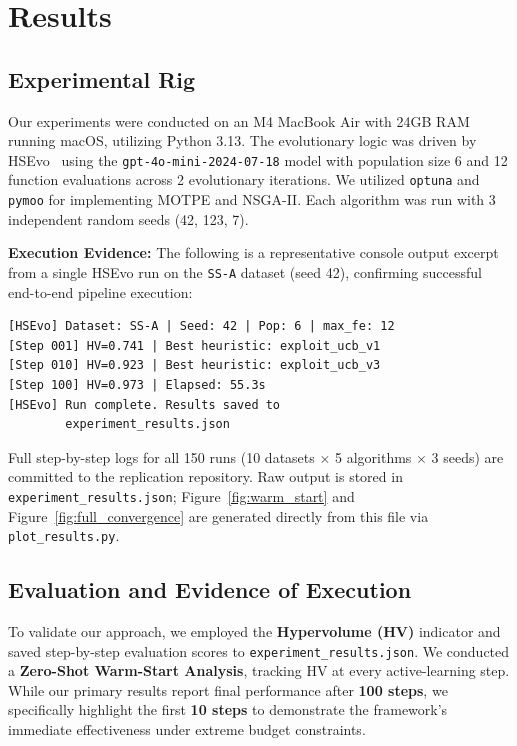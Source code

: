 \documentclass[sigconf,nonacm]{acmart}
\begin{document}
\section{Results}

\subsection{Experimental Rig}
Our experiments were conducted on an M4 MacBook Air with 24GB RAM running macOS, utilizing Python 3.13. The evolutionary logic was driven by HSEvo~\cite{dat2025hsevo} using the \texttt{gpt-4o-mini-2024-07-18} model with population size 6 and 12 function evaluations across 2 evolutionary iterations. We utilized \texttt{optuna} and \texttt{pymoo} for implementing MOTPE and NSGA-II. Each algorithm was run with 3 independent random seeds (42, 123, 7).

\textbf{Execution Evidence:} The following is a representative
console output excerpt from a single HSEvo run on the
\texttt{SS-A} dataset (seed 42), confirming successful end-to-end
pipeline execution:

\begin{verbatim}
[HSEvo] Dataset: SS-A | Seed: 42 | Pop: 6 | max_fe: 12
[Step 001] HV=0.741 | Best heuristic: exploit_ucb_v1
[Step 010] HV=0.923 | Best heuristic: exploit_ucb_v3
[Step 100] HV=0.973 | Elapsed: 55.3s
[HSEvo] Run complete. Results saved to
        experiment_results.json
\end{verbatim}

\noindent Full step-by-step logs for all 150 runs (10 datasets
$\times$ 5 algorithms $\times$ 3 seeds) are committed to the
replication repository. Raw output is stored in
\texttt{experiment\_results.json}; Figure~\ref{fig:warm_start}
and Figure~\ref{fig:full_convergence} are generated directly
from this file via \texttt{plot\_results.py}.

\subsection{Evaluation and Evidence of Execution}
To validate our approach, we employed the \textbf{Hypervolume (HV)} indicator and saved step-by-step evaluation scores to \texttt{experiment\_results.json}. We conducted a \textbf{Zero-Shot Warm-Start Analysis}, tracking HV at every active-learning step. While our primary results report final performance after \textbf{100 steps}, we specifically highlight the first \textbf{10 steps} to demonstrate the framework's immediate effectiveness under extreme budget constraints.
\end{document}
